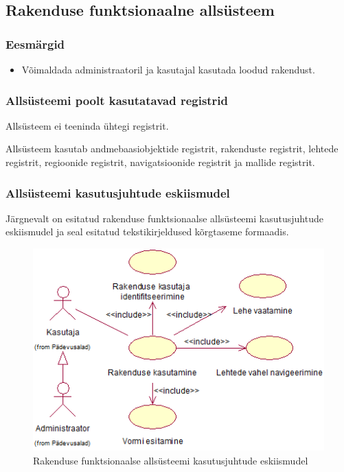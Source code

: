 \documentclass[a4paper,12pt]{article} %
\begin{document}
\subsection{Rakenduse funktsionaalne allsüsteem}
\subsubsection{Eesmärgid}
\begin{itemize}
\item Võimaldada administraatoril ja kasutajal kasutada loodud rakendust.
\end{itemize}
\subsubsection{Allsüsteemi poolt kasutatavad registrid}
Allsüsteem ei teeninda ühtegi registrit.\par
Allsüsteem kasutab andmebaasiobjektide registrit, rakenduste registrit, lehtede registrit, regioonide registrit, navigatsioonide registrit ja mallide registrit.
\subsubsection{Allsüsteemi kasutusjuhtude eskiismudel}
Järgnevalt on esitatud rakenduse funktsionaalse allsüsteemi kasutusjuhtude eskiismudel ja seal esitatud tekstikirjeldused kõrgtaseme formaadis.
\begin{figure}[H]
\begin{center}
\includegraphics[bb=0 0 432 301,scale=1]{./diagrams/application-subsystem-use-case-digram.png}
\caption{Rakenduse funktsionaalse allsüsteemi kasutusjuhtude eskiismudel}
\end{center}
\end{figure}
\end{document}
